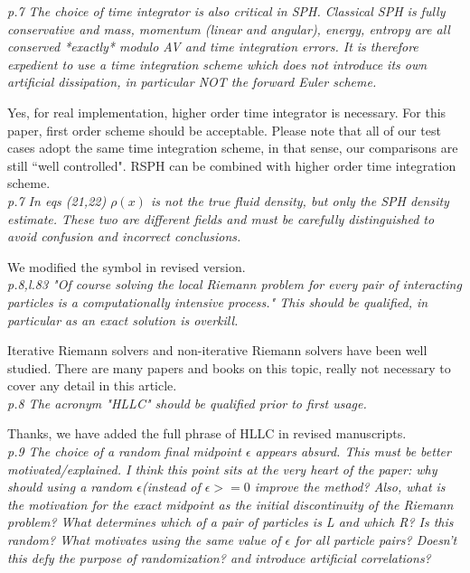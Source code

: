 \documentclass[10pt,a4paper]{article}
\begin{document}
\textit{p.7 The choice of time integrator is also critical in SPH. Classical SPH is fully conservative and mass, momentum (linear and angular), energy, entropy are all conserved *exactly* modulo AV and time integration errors. It is therefore expedient to use a time integration scheme which does not introduce its own artificial dissipation, in particular NOT the forward Euler scheme.}

Yes, for real implementation, higher order time integrator is necessary. For this paper, first order scheme should be acceptable. Please note that all of our test cases adopt the same time integration scheme, in that sense, our comparisons are still ``well controlled". RSPH can be combined with higher order time integration scheme. 
\\[3pt]

\textit{p.7 In eqs (21,22) $\rho(x)$ is not the true fluid density, but only the SPH density estimate. These two are different fields and must be carefully distinguished to avoid confusion and incorrect conclusions.}

We modified the symbol in revised version.
\\[3pt]

\textit{p.8,l.83 "Of course solving the local Riemann problem for every pair of interacting particles is a computationally intensive process." This should be qualified, in particular as an exact solution is overkill.}

Iterative Riemann solvers and non-iterative Riemann solvers have been well studied. There are many papers and books \citep[][e.g.]{toro2013riemann} on this topic, really not necessary to cover any detail in this article.
\\[3pt]

\textit{p.8 The acronym "HLLC" should be qualified prior to first usage.}

Thanks, we have added the full phrase of HLLC in revised manuscripts.
\\[3pt]

\textit{p.9 The choice of a random final midpoint  $\epsilon$ appears absurd. This must be better motivated/explained. I think this point sits at the very heart of the paper: why should using a random $\epsilon$(instead of $\epsilon>=0$ improve the method?
Also, what is the motivation for the exact midpoint as the initial discontinuity of the Riemann problem? What determines which of a pair of particles is L and which R? Is this random? What motivates using the same value of $\epsilon$ for all particle pairs? Doesn't this defy the purpose of randomization? and introduce artificial correlations?}
\end{document}
